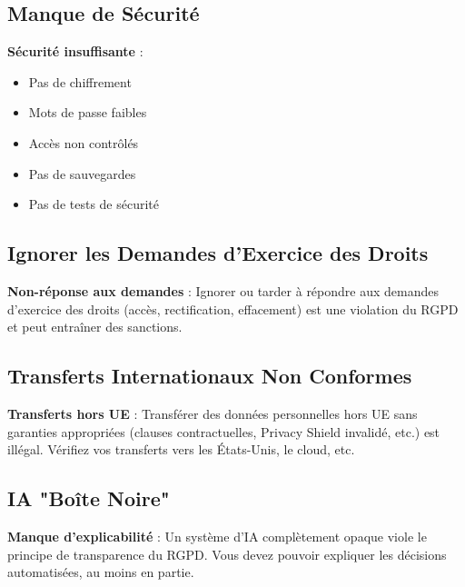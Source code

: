 \documentclass[11pt,a4paper]{article}
\begin{document}
\subsection{Manque de Sécurité}

\begin{dangerbox}
\textbf{Sécurité insuffisante} :
\begin{itemize}
    \item Pas de chiffrement
    \item Mots de passe faibles
    \item Accès non contrôlés
    \item Pas de sauvegardes
    \item Pas de tests de sécurité
\end{itemize}
\end{dangerbox}

\subsection{Ignorer les Demandes d'Exercice des Droits}

\begin{dangerbox}
\textbf{Non-réponse aux demandes} : Ignorer ou tarder à répondre aux demandes d'exercice des droits (accès, rectification, effacement) est une violation du RGPD et peut entraîner des sanctions.
\end{dangerbox}

\subsection{Transferts Internationaux Non Conformes}

\begin{dangerbox}
\textbf{Transferts hors UE} : Transférer des données personnelles hors UE sans garanties appropriées (clauses contractuelles, Privacy Shield invalidé, etc.) est illégal. Vérifiez vos transferts vers les États-Unis, le cloud, etc.
\end{dangerbox}

\subsection{IA "Boîte Noire"}

\begin{dangerbox}
\textbf{Manque d'explicabilité} : Un système d'IA complètement opaque viole le principe de transparence du RGPD. Vous devez pouvoir expliquer les décisions automatisées, au moins en partie.
\end{dangerbox}
\end{document}
